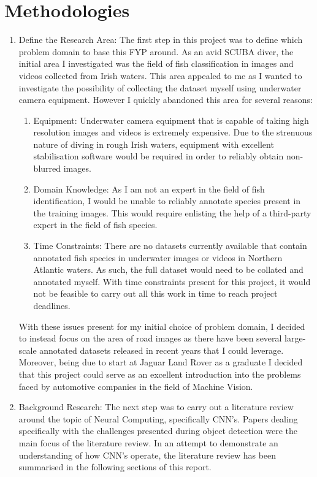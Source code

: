 \documentclass[12pt]{report}
\begin{document}
\section{Methodologies}
\begin{flushleft}
\begin{enumerate}
\item Define the Research Area: The first step in this project was to define which problem domain to base this FYP around. As an avid SCUBA diver, the initial area I investigated was the field of fish classification in images and videos collected from Irish waters. This area appealed to me as I wanted to investigate the possibility of collecting the dataset myself using underwater camera equipment. However I quickly abandoned this area for several reasons:
\begin{enumerate}
\item Equipment: Underwater camera equipment that is capable of taking high resolution images and videos is extremely expensive. Due to the strenuous nature of diving in rough Irish waters, equipment with excellent stabilisation software would be required in order to reliably obtain non-blurred images.
\item Domain Knowledge: As I am not an expert in the field of fish identification, I would be unable to reliably annotate species present in the training images. This would require enlisting the help of a third-party expert in the field of fish species.
\item Time Constraints: There are no datasets currently available that contain annotated fish species in underwater images or videos in Northern Atlantic waters. As such, the full dataset would need to be collated and annotated myself. With time constraints present for this project, it would not be feasible to carry out all this work in time to reach project deadlines.
\end{enumerate}
With these issues present for my initial choice of problem domain, I decided to instead focus on the area of road images as there have been several large-scale annotated datasets released in recent years that I could leverage. Moreover, being due to start at Jaguar Land Rover as a graduate I decided that this project could serve as an excellent introduction into the problems faced by automotive companies in the field of Machine Vision.
\item Background Research: The next step was to carry out a literature review around the topic of Neural Computing, specifically CNN's. Papers dealing specifically with the challenges presented during object detection were the main focus of the literature review. In an attempt to demonstrate an understanding of how CNN's operate, the literature review has been summarised in the following sections of this report.

\end{enumerate}
\end{flushleft}
\end{document}
